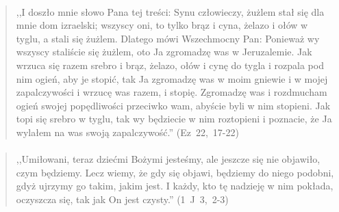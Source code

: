 \documentclass[10pt,a4paper,oneside]{article}
\begin{document}
\paragraph{}
\begin{quote}
,,I doszło mnie słowo Pana tej treści: Synu człowieczy, żużlem stał się dla mnie dom izraelski; wszyscy oni, to tylko brąz i cyna, żelazo i ołów w tyglu, a stali się żużlem. Dlatego mówi Wszechmocny Pan: Ponieważ wy wszyscy staliście się żużlem, oto Ja zgromadzę was w Jeruzalemie. Jak wrzuca się razem srebro i brąz, żelazo, ołów i cynę do tygla i rozpala pod nim ogień, aby je stopić, tak Ja zgromadzę was w moim gniewie i w mojej zapalczywości i wrzucę was razem, i stopię. Zgromadzę was i rozdmucham ogień swojej popędliwości przeciwko wam, abyście byli w nim stopieni. Jak topi się srebro w tyglu, tak wy będziecie w nim roztopieni i poznacie, że Ja wylałem na was swoją zapalczywość.'' \mbox{(Ez 22, 17-22)}
\end{quote}
\paragraph{}
\begin{quote}
,,Umiłowani, teraz dziećmi Bożymi jesteśmy, ale jeszcze się nie objawiło, czym będziemy. Lecz wiemy, że gdy się objawi, będziemy do niego podobni, gdyż ujrzymy go takim, jakim jest. I każdy, kto tę nadzieję w nim pokłada, oczyszcza się, tak jak On jest czysty.'' \mbox{(1 J 3, 2-3)}
\end{quote}
\end{document}
